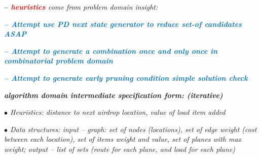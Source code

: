 \documentclass[12pt]{article}
\renewcommand{\_}{\kern-1.5pt\textunderscore\kern-1.5pt}
\begin{document}
\begin{adjustwidth}{0.83in}{-0.01in}
\textbf{–  \textit{\textcolor[HTML]{FF0000}{heuristics }}}\textit{come from problem domain insight:}\par

\end{adjustwidth}

\begin{adjustwidth}{1.26in}{-0.35in}
\textbf{\textit{\textcolor[HTML]{0070C0}{-- Attempt use PD next state generator to reduce set-of candidates}}\textcolor[HTML]{0070C0}{ \textit{ASAP}}}\par

\end{adjustwidth}

\begin{adjustwidth}{1.26in}{0.04in}
\textbf{\textit{\textcolor[HTML]{0070C0}{-- Attempt to generate a combination once and only once in combinatorial problem domain}}}\par

\end{adjustwidth}

\begin{adjustwidth}{1.26in}{0.66in}
\textbf{\textit{\textcolor[HTML]{0070C0}{-- Attempt to generate early pruning condition simple solution check}}}\par

\end{adjustwidth}


\vspace{\baselineskip}
\begin{adjustwidth}{0.0in}{-0.01in}
\textbf{\textit{algorithm domain intermediate speciﬁcation form: (iterative)}}\par

\end{adjustwidth}

\begin{adjustwidth}{0.32in}{-0.01in}
\textit{$\bullet$  Heuristics: distance to next airdrop location, value of load item added}\par

\end{adjustwidth}

\begin{adjustwidth}{0.32in}{-0.01in}
\textit{$\bullet$  Data structures: input – graph: set of nodes (locations), set of edge weight (cost between each location), set of items weight and value, set of planes with max weight; output – list of sets (route for each plane, and load for each plane)}\par

\end{adjustwidth}
\end{document}
